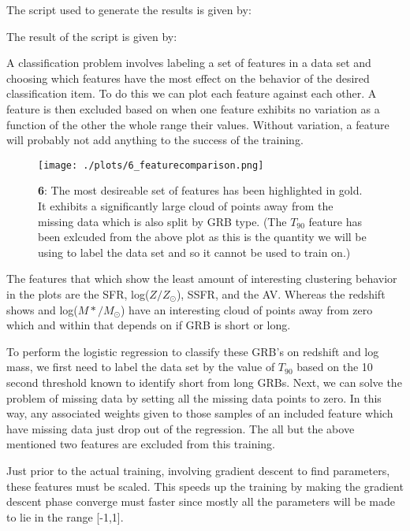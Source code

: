 
The script used to generate the results is given by:



The result of the script is given by:





A classification problem involves labeling a set of features in a data set and choosing which features have the most effect on the behavior of the desired classification item. To do this we can plot each feature against each other. A feature is then excluded based on when one feature exhibits no variation as a function of the other the whole range their values. Without variation, a feature will probably not add anything to the success of the training.


\begin{figure}[h!]
  \centering
  \texttt{[image: ./plots/6\_featurecomparison.png]}
  \caption{\textbf{6}: The most desireable set of features has been highlighted in gold. It exhibits a significantly large cloud of points away from the missing data which is also split by GRB type. (The $T_{90}$ feature has been exlcuded from the above plot as this  is the quantity we will be using to label the data set and so it cannot be used to train on.)}
  \label{fig:featurecomparison}
\end{figure}

The features that which show the least amount of interesting clustering behavior in the plots are the SFR, log($Z/Z_{\odot}$), SSFR, and the AV. Whereas the redshift shows and log($M*/M_{\odot}$) have an interesting cloud of points away from zero which and within that depends on if GRB is short or long.

To perform the logistic regression to classify these GRB's on redshift and log mass, we first need to label the data set by the value of $T_{90}$ based on the 10 second threshold known to identify short from long GRBs. Next, we can solve the problem of missing data by setting all the missing data points to zero. In this way, any associated weights given to those samples of an included feature which have missing data just drop out of the regression. The all but the above mentioned two features are excluded from this training.

Just prior to the actual training, involving gradient descent to find parameters, these features must be scaled. This speeds up the training by making the gradient descent phase converge must faster since mostly all the parameters will be made to lie in the range [-1,1].

